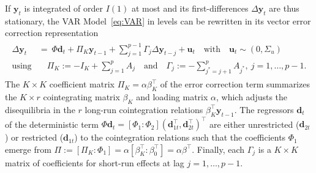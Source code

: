 If $ \boldsymbol{y}_{t} $ is integrated of order $ I(1) $ at most and its first-differences $ \Delta \boldsymbol{y}_{t} $ are thus stationary, the VAR Model~\eqref{eq:VAR} in levels can be rewritten in its vector error correction representation
\begin{align} \label{eq:VECM}
\begin{split}
	\Delta \boldsymbol{y}_{t} \ & = \ \Phi \boldsymbol{d}_{t} + \Pi_{K} \boldsymbol{y}_{t-1} + \sum_{j=1}^{p-1} \Gamma_{j} \Delta \boldsymbol{y}_{t-j} + \boldsymbol{u}_{t} \quad \textrm{with} \quad \boldsymbol{u}_{t} \sim (0,\Sigma_u)
	\\ \textrm{using} & \quad \Pi_{K} := -I_K+\sum_{j=1}^{p} A_j \quad \textrm{and} \quad \Gamma_j := -\sum_{j^*=j+1}^{p} A_{j^*}, \ j=1,\ldots,p-1.
\end{split}
\end{align}
The $ K \times K $ coefficient matrix $ \Pi_{K} = \alpha\beta_{K}^\top $ of the error correction term summarizes the \mbox{$ K \times r $} cointegrating matrix $ \beta_{K} $ and loading matrix $ \alpha $, which adjusts the disequilibria in the $ r $ long-run cointegration relations $ \beta_{K}^\top \boldsymbol{y}_{t-1} $. The regressors $ \boldsymbol{d}_{t} $ of the deterministic term $ \Phi \boldsymbol{d}_t = \left[ \Phi_1 : \Phi_{2} \right] \left( \boldsymbol{d}_{1t}^\top, \boldsymbol{d}_{2t}^\top \right)^\top $ are either unrestricted ($ \boldsymbol{d}_{2t} $) or restricted ($ \boldsymbol{d}_{1t} $) to the cointegration relations such that the coefficients $ \Phi_1 $ emerge from $ \Pi := \left[ \Pi_{K} : \Phi_1 \right] = \alpha \left[ \beta_{K}^\top : \beta_0^\top \right] = \alpha \beta^\top $. Finally, each $ \Gamma_{j} $ is a $ K \times K $ matrix of coefficients for short-run effects at lag $ j=1,\ldots,p-1 $.


